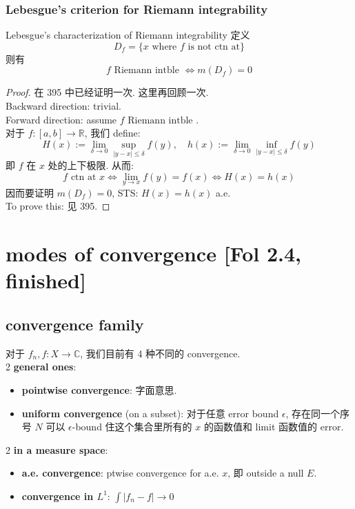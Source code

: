 \documentclass[lang=cn,11pt]{elegantbook}
\begin{document}
\subsection{Lebesgue's criterion for Riemann integrability}

\begin{theorem}{Lebesgue's characterization of Riemann integrability}
     定义 \[
    D_f = \{ x \text{ where } f \text{ is not ctn at}   \}
    \]
    则有 \[
    f \text{ Riemann intble } \Longleftrightarrow m(D_f) = 0 \]
\end{theorem}
\begin{proof}
    在 395 中已经证明一次. 这里再回顾一次.\\
    Backward direction: trivial. \\
    Forward direction: assume $   f \text{ Riemann intble }$. \\
    对于 $f:[a,b] \to \mathbb{R}$,  我们 define: \[
    H(x)  := \lim_{\delta \to 0} \sup_{|y-x| \leq \delta} f(y), \quad h(x) := \lim_{\delta \to 0} \inf_{|y-x| \leq \delta} f(y)
     \]
    即 $f$ 在 $x$ 处的上下极限. 从而: \[
    f \text{ ctn at } x \Longleftrightarrow  \lim_{y \to x} f(y) = f(x)  \Longleftrightarrow H(x) = h(x)
    \]因而要证明 $m(D_f) = 0$, STS: $H(x) = h(x)$ a.e.\\
To prove this: 见 395.
\end{proof}





\chapter{modes of convergence [Fol 2.4, finished]}
\section{convergence family}
对于 $f_n,f:X \rightarrow \mathbb{C}$, 我们目前有 4 种不同的 convergence.\\
2 \textbf{general ones}:
\begin{itemize}
    \item \textbf{pointwise convergence}: 字面意思. 
    \item \textbf{uniform convergence} (on a subset): 对于任意 error bound $\epsilon$, 存在同一个序号 $N$ 可以 $\epsilon$-bound 住这个集合里所有的 $x$ 的函数值和 limit 函数值的 error. 
\end{itemize}
2 \textbf{in a measure space}:
\begin{itemize}
    \item \textbf{a.e. convergence}: ptwise convergence for a.e. $x$, 即 outside a null $E$.
    \item \textbf{convergence in $L^1$}: $\int |f_n -f| \rightarrow 0$
\end{itemize}
\end{document}
